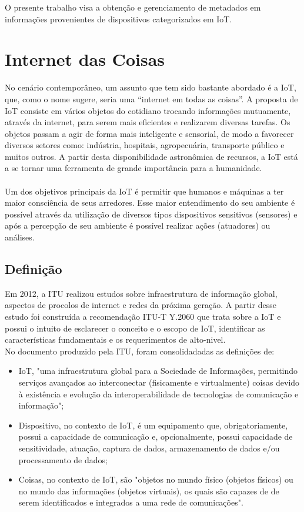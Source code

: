 O presente trabalho visa a obtenção e gerenciamento de metadados em informações provenientes de
dispositivos categorizados em \acrfull{IoT}. %


\section{Internet das Coisas}%
No cenário contemporâneo, um assunto que tem sido bastante abordado é a
\acrlong{IoT}, que, como o nome sugere, seria uma “internet em todas as
coisas”. A proposta de \acrshort{IoT} consiste em vários objetos do cotidiano trocando informações
mutuamente, através da internet, para serem mais eficientes e realizarem diversas tarefas.
Os objetos passam a agir de forma mais inteligente e sensorial, de modo a favorecer diversos setores como:
indústria, hospitais, agropecuária, transporte público e muitos outros. A partir desta
disponibilidade astronômica de recursos, a \acrlong{IoT} está a se tornar uma ferramenta
de grande importância para a humanidade.\\\\
Um dos objetivos principais da \acrlong{IoT} é permitir
que humanos e máquinas a ter maior consciência de seus arredores.
 Esse maior entendimento do seu ambiente é possível através da utilização
 de diversos tipos dispositivos sensitivos (sensores) e após a percepção
 de seu ambiente é possível realizar ações (atuadores) ou análises.
\subsection{Definição}
	Em 2012, a \acrfull{ITU} realizou estudos sobre infraestrutura
	de informação global, aspectos de procolos de internet e redes da próxima geração.
	A partir desse estudo foi construída a recomendação ITU-T Y.2060 \cite{ITU} que trata sobre a \acrlong{IoT}
	e possui o intuito de esclarecer o conceito e o escopo de \acrshort{IoT}, identificar
	as características fundamentais e os requerimentos de alto-nivel.
\\	No documento produzido pela \acrshort{ITU}, foram consolidadadas as definições de:
	\begin{itemize}
		\item \acrlong{IoT}, "uma infraestrutura global para a Sociedade de Informações, permitindo serviços avançados ao
		interconectar (fisicamente e virtualmente) coisas devido à existência e evolução da interoperabilidade
	de tecnologias de comunicação e informação";
		\item Dispositivo, no contexto de \acrshort{IoT}, é um equipamento que, obrigatoriamente, possui a capacidade
		de comunicação e, opcionalmente, possui capacidade de sensitividade, atuação, captura de dados,
		armazenamento de dados e/ou processamento de dados;
		\item Coisas, no contexto de \acrshort{IoT}, são "objetos
	no mundo físico (objetos físicos) ou no mundo das informações (objetos virtuais), os quais são capazes de
	de serem identificados e integrados a uma rede de comunicações".
	\end{itemize}


